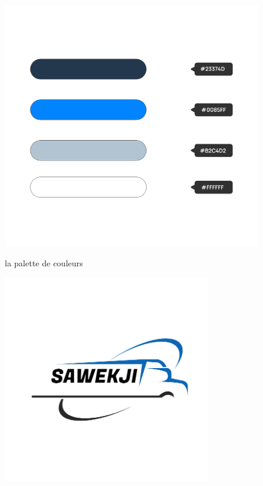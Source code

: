 \begin{figure}[h!]
  \centering
  \begin{minipage}[t]{0.45\textwidth}
    \centering
    \includegraphics[width=1\textwidth]{chap2.images/palette.png}
    \caption{la palette de couleurs}
  \end{minipage}
  \hfill
  \begin{minipage}[t]{0.45\textwidth}
    \centering
    \includegraphics[width=0.8\textwidth]{chap2.images/logo.png}
    \caption{}
  \end{minipage}
\end{figure}

